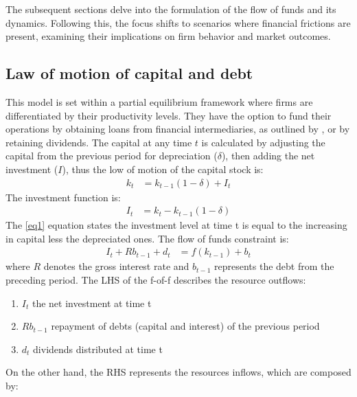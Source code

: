\documentclass[12pt]{article}
\begin{document}
The subsequent sections delve into the formulation of the flow of funds and its dynamics. Following this, the focus
shifts to scenarios  where financial frictions are present, examining their
implications on firm behavior and market outcomes. %

\subsection{Law of motion of capital and debt}

This model is set within a partial equilibrium framework where firms are differentiated by their productivity levels.
They have the option to fund their operations by obtaining loans from financial intermediaries, as outlined by
\cite{bernanke1995inside}, or by retaining dividends. The capital at any time \(t\) is calculated by
adjusting the capital from the previous period for depreciation (\(\delta\)), then adding the net investment (\(I\)), thus the
low of motion of the capital stock is: 
\begin{align*}
    k_t &= k_{t-1}(1 - \delta)  + I_t  \tag{1} \label{eq1}
\end{align*} 
The investment function is:
\begin{align*}
    I_t &= k_t - k_{t-1}\left(1-\delta\right) 
\end{align*} 
The \ref{eq1} equation states the investment level at time t is equal to the increasing in capital less the depreciated ones. 
The flow of funds constraint is:
\begin{align*}
    I_t + R b_{t-1} + d_t &= f(k_{t-1}) + b_t \tag{2} \label{eq2}
\end{align*}
where \(R\) denotes the gross interest rate and \(b_{t-1}\) represents the debt from the preceding period.
The LHS of the f-of-f describes the resource outflows: 
\begin{enumerate}
    \item \(I_t\) the net investment at time t
    \item \(R b_{t-1}\) repayment of debts (capital and interest) of the previous period
    \item \(d_t\) dividends distributed at time t
\end{enumerate}
On the other hand, the RHS represents the resources inflows, which are composed by:
\end{document}

